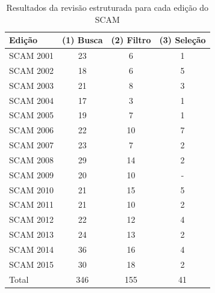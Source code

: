 \begin{table}[h]
\caption{Resultados da revisão estruturada para cada edição do SCAM}
\centering
\begin{tabular}{| l | c | c | c |}
\hline
Edição & (1) Busca & (2) Filtro & (3) Seleção \\
\hline
SCAM 2001 & 23    & 6         & 1           \\
SCAM 2002 & 18    & 6         & 5           \\
SCAM 2003 & 21    & 8         & 3           \\
SCAM 2004 & 17    & 3         & 1           \\
SCAM 2005 & 19    & 7         & 1           \\
SCAM 2006 & 22    & 10        & 7           \\
SCAM 2007 & 23    & 7         & 2           \\
SCAM 2008 & 29    & 14        & 2           \\
SCAM 2009 & 20    & 10        & -           \\
SCAM 2010 & 21    & 15        & 5           \\
SCAM 2011 & 21    & 10        & 2           \\
SCAM 2012 & 22    & 12        & 4           \\
SCAM 2013 & 24    & 13        & 2           \\
SCAM 2014 & 36    & 16        & 4           \\
SCAM 2015 & 30    & 18        & 2           \\
\hline
Total     & 346   & 155       & 41          \\
\hline
\end{tabular}
\label{artigos-do-scam}
\end{table}

